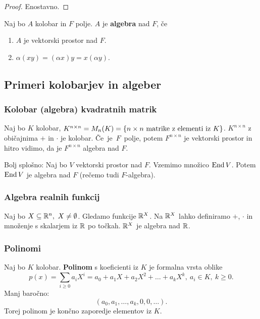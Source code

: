 \begin{proof}
    Enostavno.
\end{proof}

\begin{definicija}
    Naj bo $A$ kolobar in $F$ polje. $A$ je \textbf{algebra} nad $F$, če 
    \begin{enumerate}
        \item $A$ je vektorski prostor nad $F$.
        \item $\alpha(xy) = (\alpha x)y = x(\alpha y)$.
    \end{enumerate}
\end{definicija}

\subsection{Primeri kolobarjev in algeber}
\subsubsection*{Kolobar (algebra) kvadratnih matrik}
Naj bo $K$ kolobar, $K^{n \times n} = M_n(K) = \left\{n \times n \text{ matrike z elementi iz } K\right\}$. $K^{n \times n}$ z običajnima $+$ in $\cdot$ je kolobar. Če~je~$F$~polje, potem $F^{n \times n}$ je vektorski prostor in hitro vidimo, da je $F^{n \times n}$ algebra nad $F$.

Bolj splošno: Naj bo $V$ vektorski prostor nad $F$. Vzemimo množico $\operatorname{End} V$. Potem $\operatorname{End} V$ je algebra nad $F$ (rečemo tudi $F$-algebra).

\subsubsection*{Algebra realnih funkcij}
Naj bo $X \subseteq \mathbb{R}^n, \ X \neq \emptyset$. Gledamo funkcije $\mathbb{R}^X$. Na $\mathbb{R}^X$ lahko definiramo $+$, $\cdot$ in množenje s skalarjem iz $\mathbb{R}$ po točkah. $\mathbb{R}^X$ je algebra nad $\mathbb{R}$.

\subsubsection*{Polinomi}
Naj bo $K$ kolobar. \textbf{Polinom} s koeficienti iz $K$ je formalna vrsta oblike
$$p(x) = \sum_{i \geq 0} a_iX^i = a_0 + a_1X + a_2 X^2 + \ldots + a_k X^k, \ a_i \in K, \ k \geq 0.$$
Manj baročno:
$$(a_0, a_1, \ldots, a_k, 0, 0, \ldots).$$
Torej polinom je končno zaporedje elementov iz $K$.

